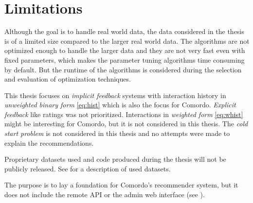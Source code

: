 
\section{Limitations}\label{sec:intro:limitations}

Although the goal is to handle real world data, the data considered in the thesis is of a limited size compared to the larger real world data. The algorithms are not optimized enough to handle the larger data and they are not very fast even with fixed parameters, which makes the parameter tuning algorithms time consuming by default. But the runtime of the algorithms is considered during the selection and evaluation of optimization techniques.

This thesis focuses on \textit{implicit feedback} systems with interaction history in \textit{unweighted binary form} \eqref{eq:hist} which is also the focus for Comordo. \textit{Explicit feedback} like ratings was not prioritized. Interactions in \textit{weighted form} \eqref{eq:whist} might be interesting for Comordo, but it is not considered in this thesis. The \textit{cold start problem} \citep{cacheda2011comparison} is not considered in this thesis and no attempts were made to explain the recommendations.

Proprietary datasets used and code produced during the thesis will not be publicly released. See  for a description of used datasets.

The purpose is to lay a foundation for Comordo's recommender system, but it does not include the remote API or the admin web interface (see ).

